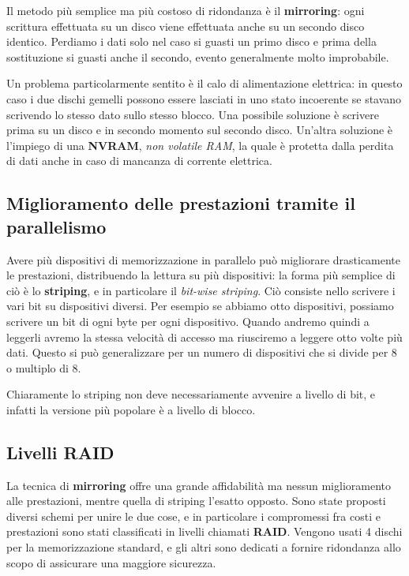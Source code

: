         Il metodo più semplice ma più costoso di ridondanza è il \textbf{mirroring}: ogni scrittura effettuata su un disco viene effettuata anche su un secondo disco identico. Perdiamo i dati solo nel caso si guasti un primo disco e prima della sostituzione si guasti anche il secondo, evento generalmente molto improbabile.
        
        Un problema particolarmente sentito è il calo di alimentazione elettrica: in questo caso i due dischi gemelli possono essere lasciati in uno stato incoerente se stavano scrivendo lo stesso dato sullo stesso blocco. Una possibile soluzione è scrivere prima su un disco e in secondo momento sul secondo disco. Un'altra soluzione è l'impiego di una \textbf{NVRAM}, \textit{non volatile RAM}, la quale è protetta dalla perdita di dati anche in caso di mancanza di corrente elettrica.
        
    \subsection{Miglioramento delle prestazioni tramite il parallelismo}
        Avere più dispositivi di memorizzazione in parallelo può migliorare drasticamente le prestazioni, distribuendo la lettura su più dispositivi: la forma più semplice di ciò è lo \textbf{striping}, e in particolare il \textit{bit-wise striping}. Ciò consiste nello scrivere i vari bit su dispositivi diversi. Per esempio se abbiamo otto dispositivi, possiamo scrivere un bit di ogni byte per ogni dispositivo. Quando andremo quindi a leggerli avremo la stessa velocità di accesso ma riusciremo a leggere otto volte più dati. Questo si può generalizzare per un numero di dispositivi che si divide per 8 o multiplo di 8.
        
        Chiaramente lo striping non deve necessariamente avvenire a livello di bit, e infatti la versione più popolare è a livello di blocco.
        
    \subsection{Livelli RAID}
        La tecnica di \textbf{mirroring} offre una grande affidabilità ma nessun miglioramento alle prestazioni, mentre quella di striping l'esatto opposto. Sono state proposti diversi schemi per unire le due cose, e in particolare i compromessi fra costi e prestazioni sono stati classificati in livelli chiamati \textbf{RAID}. Vengono usati 4 dischi per la memorizzazione standard, e gli altri sono dedicati a fornire ridondanza allo scopo di assicurare una maggiore sicurezza.
        
